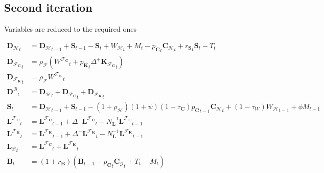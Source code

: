 \documentclass[a4paper, headings=standardclasses]{scrartcl}
\numberwithin{equation}{subsection}
\begin{document}
\subsection{Second iteration}
Variables are reduced to the required ones

{\allowdisplaybreaks \tiny
	\begin{align}
		{\mathbf{D}_\mathcal{H}}_t                        & = {\mathbf{D}_\mathcal{H}}_{t-1} + \mathbf{S}_{t-1} - \mathbf{S}_t + {W_\mathcal{H}} _t + M _t - {p_\mathbf{C}}_t {\mathbf{C}_\mathcal{H}}_t + {r_\mathbf{S}}_t \mathbf{S}_t - T_t                                           \\
		{\mathbf{D}_{\mathcal{F}_\mathbf{C}}}_t           & = \rho_\mathcal{F}({W^{\mathcal{F}_\mathbf{C}}}_t + {p_{\mathbf{K}}}_t {\Delta^+{\mathbf{K}_{\mathcal{F}_\mathbf{C}}}}_t) \\
		{\mathbf{D}_{\mathcal{F}_\mathbf{K}}}_t           & =  \rho_\mathcal{F}{W^{\mathcal{F}_\mathbf{K}}}_t \\
		{\mathbf{D}^\mathcal{B}}_t                        & = {\mathbf{D}_\mathcal{H}}_t + {\mathbf{D}_{\mathcal{F}_\mathbf{C}}}_t + {\mathbf{D}_{\mathcal{F}_\mathbf{K}}}_t                                                                                                                                                              \\
		\mathbf{S}_t                        & = {\mathbf{D}_\mathcal{H}}_{t-1} + \mathbf{S}_{t-1} - (1 + \rho_\mathcal{H}) (1 + \psi) (1 + \tau_\mathbf{C}) {p_\mathbf{C}}_{t-1} {\mathbf{C}_\mathcal{H}}_t + (1-\tau_W) {W_\mathcal{H}}_{t-1} + \phi M_{t-1} \\
		{\mathbf{L}^{\mathcal{F}_\mathbf{C}}}_t           & = {\mathbf{L}^{\mathcal{F}_\mathbf{C}}}_{t-1} + \Delta^+{\mathbf{L}^{\mathcal{F}_\mathbf{C}}}_t - N_\mathbf{L}^{-1} {\mathbf{L}^{\mathcal{F}_\mathbf{C}}}_{t-1}\\
		{\mathbf{L}^{\mathcal{F}_\mathbf{K}}}_t           & =  {\mathbf{L}^{\mathcal{F}_\mathbf{K}}}_{t-1} + \Delta^+{\mathbf{L}^{\mathcal{F}_\mathbf{K}}}_t - N_\mathbf{L}^{-1} {\mathbf{L}^{\mathcal{F}_\mathbf{K}}}_{t-1} \\
		{\mathbf{L}_\mathcal{B}}_t                        & = {\mathbf{L}^{\mathcal{F}_\mathbf{C}}}_t + {\mathbf{L}^{\mathcal{F}_\mathbf{K}}}_t                                                                                                                                                                                           \\
		\mathbf{B}_t                        & = (1 + r_\mathbf{B}) (\mathbf{B}_{t-1} - {p_\mathbf{C}}_t {\mathbf{C}_\mathcal{G}}_t + T_t - M_t)                                                                                                                                                                                                                                                                            \\

\end{align}}
\end{document}
